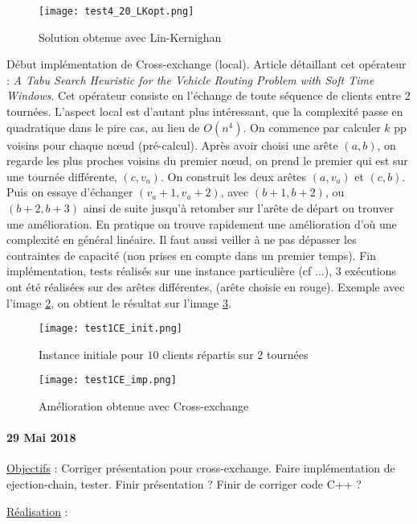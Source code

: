 \documentclass[a4paper,11pt]{article}%
\begin{document}
\begin{figure}[ht]
\centering
\texttt{[image: test4\_20\_LKopt.png]}
	\caption{Solution obtenue avec Lin-Kernighan}	\label{test4_20_LKopt}
\end{figure}

Début implémentation de Cross-exchange (local). Article détaillant cet opérateur : \emph{A Tabu Search Heuristic for the Vehicle Routing Problem with Soft Time Windows}. Cet opérateur consiste en l'échange de toute séquence de clients entre 2 tournées. L'aspect local est d'autant plus intéressant, que la complexité passe en quadratique dans le pire cas, au lieu de $O(n^4)$. 
On commence par calculer $k$ pp voisins pour chaque nœud (pré-calcul). Après avoir choisi une arête $(a,b)$, on regarde les plus proches voisins du premier nœud, on prend le premier qui est sur une tournée différente, $(c,v_a)$. 
On construit les deux arêtes $(a,v_a)$ et $(c,b)$. Puis on essaye d'échanger $(v_a+1, v_a+2)$, avec $(b+1,b+2)$, ou $(b+2,b+3)$ ainsi de suite jusqu'à retomber sur l'arête de départ ou trouver une amélioration. 
En pratique on trouve rapidement une amélioration d'où une complexité en général linéaire. 
Il faut aussi veiller à ne pas dépasser les contraintes de capacité (non prises en compte dans un premier temps). 
Fin implémentation, tests réalisés sur une instance particulière (cf ...), 3 exécutions ont été réalisées sur des arêtes différentes, (arête choisie en rouge). Exemple avec l'image \ref{test1CE_init}, on obtient le résultat sur l'image \ref{test1CE_imp}. 

\begin{figure}[ht]
\centering
\texttt{[image: test1CE\_init.png]}
	\caption{Instance initiale pour $10$ clients répartis sur 2 tournées}
	\label{test1CE_init}
\end{figure}

\begin{figure}[ht]
\centering
\texttt{[image: test1CE\_imp.png]}
	\caption{Amélioration obtenue avec Cross-exchange}	
	\label{test1CE_imp}
\end{figure}

\paragraph*{29 Mai 2018}

\underline{Objectifs} : Corriger présentation pour cross-exchange. Faire implémentation de ejection-chain, tester. Finir présentation ? Finir de corriger code C++ ?

\underline{Réalisation} :
\end{document}
